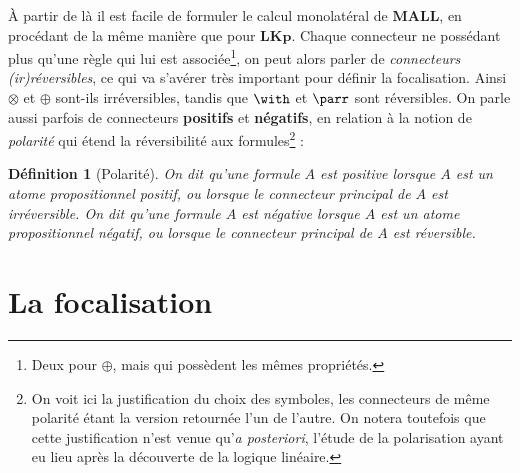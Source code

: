 \documentclass[12pt]{report}
\newtheorem{definition}{Définition}
\begin{document}
À partir de là il est facile de formuler le calcul monolatéral de $\mathbf{MALL}$, en procédant de la même manière que pour $\mathbf{LKp}$. Chaque connecteur ne possédant plus qu'une règle qui lui est associée\footnote{Deux pour $\oplus$, mais qui possèdent les mêmes propriétés.}, on peut alors parler de \emph{connecteurs (ir)réversibles}, ce qui va s'avérer très important pour définir la focalisation. Ainsi $\otimes$ et $\oplus$ sont-ils irréversibles, tandis que $\with$ et $\parr$ sont réversibles. On parle aussi parfois de connecteurs \textbf{positifs} et \textbf{négatifs}, en relation à la notion de \emph{polarité} qui étend la réversibilité aux formules\footnote{On voit ici la justification du choix des symboles, les connecteurs de même polarité étant la version retournée l'un de l'autre. On notera toutefois que cette justification n'est venue qu'\textit{a posteriori}, l'étude de la polarisation ayant eu lieu après la découverte de la logique linéaire.} :

\begin{definition}[Polarité]
	On dit qu'une formule $A$ est \emph{positive} lorsque $A$ est un atome propositionnel positif, ou lorsque le connecteur principal de $A$ est irréversible.
	On dit qu'une formule $A$ est \emph{négative} lorsque $A$ est un atome propositionnel négatif, ou lorsque le connecteur principal de $A$ est réversible.
\end{definition}

\section{La focalisation}
\end{document}

